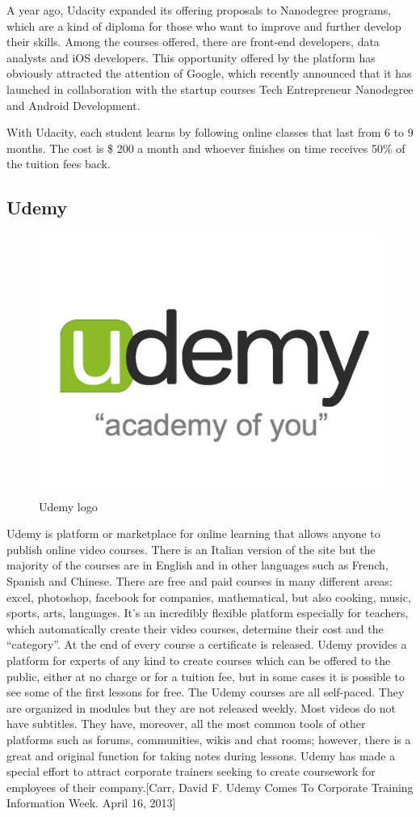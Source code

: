 A year ago, Udacity expanded its offering proposals to Nanodegree programs, which are a kind of diploma for those who want to improve and further develop their skills. Among the courses offered, there are front-end developers, data analysts and iOS developers. This opportunity offered by the platform has obviously attracted the attention of Google, which recently announced that it has launched in collaboration with the startup courses Tech Entrepreneur Nanodegree and Android Development.

With Udacity, each student learns by following online classes that last from 6 to 9 months. The cost is \$ 200 a month and whoever finishes on time receives 50\% of the tuition fees back.



\subsection{Udemy}
\label{subsec:udemy}
\begin{figure}[htb] %
 \centering
 \includegraphics[width=0.5\linewidth]{images/chapter1/udemy.jpg}\hfill
 \caption[Udemy logo]{Udemy logo}
 \label{fig:fourV}
\end{figure}

Udemy is platform or marketplace for online learning that allows anyone to publish online video  courses. There is an Italian version of the site but the majority of the courses are in English and in other languages such as French, Spanish and Chinese.
There are free and paid courses in many different areas: excel, photoshop, facebook for companies, mathematical, but also cooking, music, sports, arts, languages.
It's an incredibly flexible platform especially for teachers, which automatically create their video courses, determine their cost and the “category”.
At the end of every course a certificate is released. Udemy provides a platform for experts of any kind to create courses which can be offered to the public, either at no charge or for a tuition fee, but in some cases it is possible to see some of the first lessons for free.
The Udemy courses are all self-paced. They are organized in modules but they are not released weekly. Most videos do not have subtitles. They have, moreover, all the most common tools of other platforms such as forums, communities, wikis and chat rooms; however, there is a great and original function for taking notes during lessons.
Udemy has made a special effort to attract corporate trainers seeking to create coursework for employees of their company.[Carr, David F. Udemy Comes To Corporate Training Information Week. April 16, 2013]